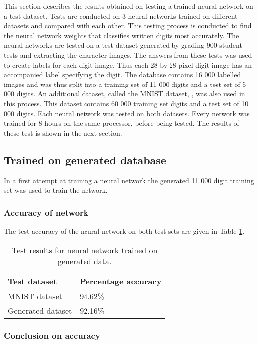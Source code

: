 This section describes the results obtained on testing a trained neural network on a test dataset. Tests are conducted on 3 neural networks trained on different datasets and compared with each other. This testing process is conducted to find the neural network weights that classifies written digits most accurately. The neural networks are tested on a test dataset generated by grading 900 student tests and extracting the character images. The answers from these tests was used to create labels for each digit image. Thus each 28 by 28 pixel digit image has an accompanied label specifying the digit. The database contains 16 000 labelled images and was thus split into a training set of 11 000 digits and a test set of 5 000 digits. An additional dataset, called the MNIST dataset, \citep{mnist}, was also used in this process. This dataset contains 60 000 training set digits and a test set of 10 000 digits. Each neural network was tested on both datasets. Every network was trained for 8 hours on the same processor, before being tested. The results of these test is shown in the next section.
\subsection{Trained on generated database}
In a first attempt at training a neural network the generated 11 000 digit training set was used to train the network.

\subsubsection{Accuracy of network}

The test accuracy of the neural network on both test sets are given in Table \ref{tbl:nnResult1}.

\begin{table}
\caption{Test results for neural network trained on generated data.} \label{tbl:nnResult1}
  \centering
\begin{tabular}{|p{4cm}|p{5cm}|}
\hline
\textbf{Test dataset}&\textbf{Percentage accuracy}\\
\hline
MNIST dataset&94.62\%\\
\hline
Generated dataset&92.16\%\\
\hline
\end{tabular}
\end{table}

\subsubsection{Conclusion on accuracy}

